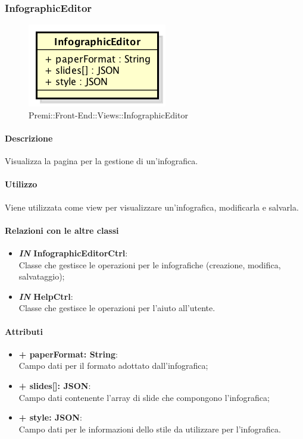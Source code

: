 \subsubsection{InfographicEditor}
	\begin{figure}[h]
		\centering
		\includegraphics[width=0.3\linewidth]{img/premi_front_end_views_infographiceditor}
		\caption[Premi::Front-End::Views::InfographicEditor]{Premi::Front-End::Views::InfographicEditor}
	\end{figure}
	
	\paragraph{Descrizione}
	Visualizza la pagina per la gestione di un'\gls{infografica}.
	
	\paragraph{Utilizzo}
	Viene utilizzata come view per visualizzare un'\gls{infografica}, modificarla e salvarla.
	
	\paragraph{Relazioni con le altre classi}
	\begin{itemize}
		\item \textbf{\textit{IN} InfographicEditorCtrl}:\\
			Classe che gestisce le operazioni per le infografiche (creazione, modifica, salvataggio);
		\item \textbf{\textit{IN} HelpCtrl}:\\
			Classe che gestisce le operazioni per l'aiuto all'utente.
	\end{itemize}
	
	\paragraph{Attributi}
	\begin{itemize}
		\item \textbf{+ paperFormat: String}:\\
			Campo dati per il formato adottato dall'\gls{infografica};
		\item \textbf{+ slides[]: \gls{JSON}}:\\
			Campo dati contenente l'array di \gls{slide} che compongono l'\gls{infografica};
		\item \textbf{+ style: \gls{JSON}}:\\
		Campo dati per le informazioni dello stile da utilizzare per l'\gls{infografica}.
	\end{itemize}
\newpage
	
